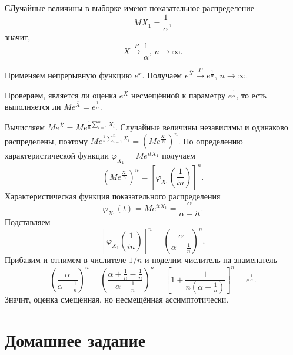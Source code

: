 СЛучайные величины в выборке имеют показательное распределение
$$MX_1 =
  \frac{1}{ \alpha },$$
значит,
$$ \overline{X} \overset{P}{ \to } \frac{1}{ \alpha }, \,
  n \to \infty.$$

Применяем непрерывную функцию $e^x$.
Получаем $e^{ \overline{X}} \overset{P}{ \to } e^{ \frac{1}{ \alpha }}, \, n \to \infty $.

Проверяем, является ли оценка $e^{ \overline{X}}$ несмещённой к параметру $e^{ \frac{1}{ \alpha }}$,
то есть выполняется ли $Me^{ \overline{X}} = e^{ \frac{1}{ \alpha }}$.

Вычисляем $Me^{ \overline{X}} = Me^{ \frac{1}{n} \sum \limits_{i = 1}^n X_i}$.
Случайные величины независимы и одинаково распределены,
поэтому $Me^{ \frac{1}{n} \sum \limits_{i = 1}^n X_i} = \left( Me^{ \frac{X_1}{n}} \right)^n$.
По определению характеристической функции $ \varphi_{X_1} = Me^{itX_1}$ получаем
$$ \left( Me^{ \frac{X_1}{n}} \right)^n =
  \left[ \varphi_{X_1} \left( \frac{1}{in} \right) \right]^n.$$
Характеристическая функция показательного распределения
$$ \varphi_{X_1} \left(t \right) =
  Me^{itX_1} =
  \frac{ \alpha }{ \alpha - it}.$$
Подставляем
$$ \left[ \varphi_{X_1} \left( \frac{1}{in} \right) \right]^n =
  \left( \frac{ \alpha }{ \alpha - \frac{1}{n}} \right)^n.$$
Прибавим и отнимем в числителе $1 / n$ и поделим числитель на знаменатель
$$ \left( \frac{ \alpha }{ \alpha - \frac{1}{n}} \right)^n =
  \left( \frac{ \alpha + \frac{1}{n} - \frac{1}{n}}{ \alpha - \frac{1}{n}} \right)^n =
  \left[ 1 + \frac{1}{n \left( \alpha - \frac{1}{n} \right)} \right]^n =
  e^{ \frac{1}{ \alpha }}.$$
Значит, оценка смещённая, но несмещённая ассимптотически.

\section*{Домашнее задание}
